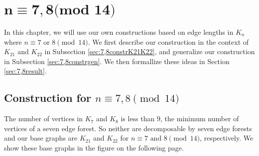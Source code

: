 \chapter{$\mathbf{n\equiv 7,8\textbf{(mod 14)}}$} \label{chap:7,8 (mod 14)}
In this chapter, we will use our own constructions based on edge lengths in $K_{n}$ where $n \equiv 7\text{ or }8 \pmod{14}$. We first describe our construction in the context of $K_{21}$ and $K_{22}$ in Subsection \ref{sec:7,8constrK21K22}, and generalize our construction in Subsection \ref{sec:7,8constrgen}. We then formallize these ideas in Section \ref{sec:7,8result}.
\section{Construction for $n\equiv 7,8 \pmod{14}$}\label{sec:7,8constr}
 The number of vertices in $K_{7}$ and $K_{8}$ is less than $9$, the minimum number of vertices of a seven edge forest. So neither are decomposable by seven edge forests and our base graphs are $K_{21}$ and $K_{22}$ for $n\equiv 7\text{ and }8\pmod{14}$, respectively. We show these base graphs in the figure on the following page.
